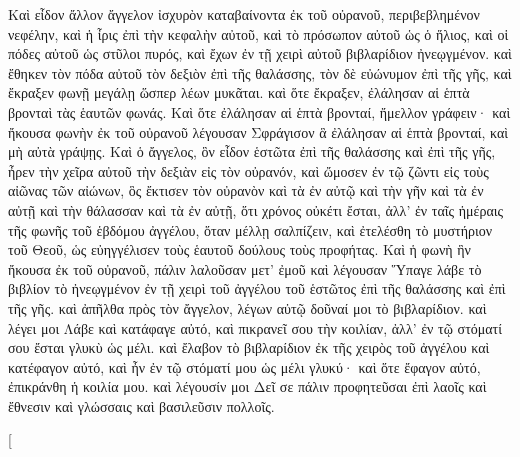 \begin{pages}
    \begin{Rightside}
        \beginnumbering
		Καὶ εἶδον ἄλλον ἄγγελον ἰσχυρὸν καταβαίνοντα ἐκ τοῦ οὐρανοῦ, περιβεβλημένον νεφέλην, καὶ ἡ ἶρις ἐπὶ τὴν κεφαλὴν αὐτοῦ, καὶ τὸ πρόσωπον αὐτοῦ ὡς ὁ ἥλιος, καὶ οἱ πόδες αὐτοῦ ὡς στῦλοι πυρός, καὶ ἔχων ἐν τῇ χειρὶ αὐτοῦ βιβλαρίδιον ἠνεῳγμένον. καὶ ἔθηκεν τὸν πόδα αὐτοῦ τὸν δεξιὸν ἐπὶ τῆς θαλάσσης, τὸν δὲ εὐώνυμον ἐπὶ τῆς γῆς, καὶ ἔκραξεν φωνῇ μεγάλῃ ὥσπερ λέων μυκᾶται. καὶ ὅτε ἔκραξεν, ἐλάλησαν αἱ ἑπτὰ βρονταὶ τὰς ἑαυτῶν φωνάς. 
		\pend
		\pstart
		Καὶ ὅτε ἐλάλησαν αἱ ἑπτὰ βρονταί, ἤμελλον γράφειν· καὶ ἤκουσα φωνὴν ἐκ τοῦ οὐρανοῦ λέγουσαν Σφράγισον ἃ ἐλάλησαν αἱ ἑπτὰ βρονταί, καὶ μὴ αὐτὰ γράψῃς. Καὶ ὁ ἄγγελος, ὃν εἶδον ἑστῶτα ἐπὶ τῆς θαλάσσης καὶ ἐπὶ τῆς γῆς, ἦρεν τὴν χεῖρα αὐτοῦ τὴν δεξιὰν εἰς τὸν οὐρανόν, καὶ ὤμοσεν ἐν τῷ ζῶντι εἰς τοὺς αἰῶνας τῶν αἰώνων, ὃς ἔκτισεν τὸν οὐρανὸν καὶ τὰ ἐν αὐτῷ καὶ τὴν γῆν καὶ τὰ ἐν αὐτῇ καὶ τὴν θάλασσαν καὶ τὰ ἐν αὐτῇ, ὅτι χρόνος οὐκέτι ἔσται, 
		\pend
		\pstart
		ἀλλ’ ἐν ταῖς ἡμέραις τῆς φωνῆς τοῦ ἑβδόμου ἀγγέλου, ὅταν μέλλῃ σαλπίζειν, καὶ ἐτελέσθη τὸ μυστήριον τοῦ Θεοῦ, ὡς εὐηγγέλισεν τοὺς ἑαυτοῦ δούλους τοὺς προφήτας. Καὶ ἡ φωνὴ ἣν ἤκουσα ἐκ τοῦ οὐρανοῦ, πάλιν λαλοῦσαν μετ’ ἐμοῦ καὶ λέγουσαν Ὕπαγε λάβε τὸ βιβλίον τὸ ἠνεῳγμένον ἐν τῇ χειρὶ τοῦ ἀγγέλου τοῦ ἑστῶτος ἐπὶ τῆς θαλάσσης καὶ ἐπὶ τῆς γῆς. 
		\pend
		\pstart
		καὶ ἀπῆλθα πρὸς τὸν ἄγγελον, λέγων αὐτῷ δοῦναί μοι τὸ βιβλαρίδιον. καὶ λέγει μοι Λάβε καὶ κατάφαγε αὐτό, καὶ πικρανεῖ σου τὴν κοιλίαν, ἀλλ’ ἐν τῷ στόματί σου ἔσται γλυκὺ ὡς μέλι. καὶ ἔλαβον τὸ βιβλαρίδιον ἐκ τῆς χειρὸς τοῦ ἀγγέλου καὶ κατέφαγον αὐτό, καὶ ἦν ἐν τῷ στόματί μου ὡς μέλι γλυκύ· καὶ ὅτε ἔφαγον αὐτό, ἐπικράνθη ἡ κοιλία μου. καὶ λέγουσίν μοι Δεῖ σε πάλιν προφητεῦσαι ἐπὶ λαοῖς καὶ ἔθνεσιν καὶ γλώσσαις καὶ βασιλεῦσιν πολλοῖς.
		\pend
        \endnumbering
    \end{Rightside}
    \begin{Leftside}
        \beginnumbering
        \pstart[

\end{Leftside}
\end{pages}
